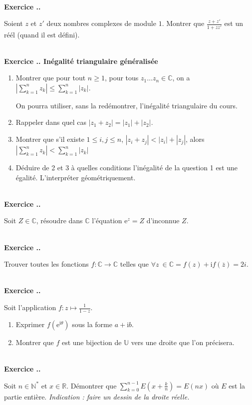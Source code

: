 \documentclass{article}
\newcommand{\mb}[1]{\mathbb{#1}}
\newcounter{exo}
\newcommand{\exercice}[1][\null]{\textbf{\\ \large Exercice \thesection.\theexo. \normalsize #1} \addtocounter{exo}{1}}
\begin{document}
\exercice

Soient $z$ et $z'$ deux nombres complexes de module $1$. Montrer que $\displaystyle \frac{z+z'}{1+zz'}$ est un réél (quand il est défini).

\exercice[Inégalité triangulaire généralisée]

\begin{enumerate}

\item Montrer que pour tout $n \ge 1$, pour tous $z_1 \dots z_n \in \mb{C}$, on a $\displaystyle \left|\sum_{k=1}^n z_k\right| \le \sum_{k=1}^n | z_k |$.

On pourra utiliser, sans la redémontrer, l'inégalité triangulaire du cours.

\item Rappeler dans quel cas $|z_1 + z_2| = |z_1| + |z_2|$.

\item Montrer que s'il existe $1 \le i,j \le n$, $|z_i + z_j| < |z_i| + |z_j|$, alors $ \left|\sum_{k=1}^n z_k\right| < \sum_{k=1}^n | z_k |$ 

\item Déduire de 2 et 3 à quelles conditions l'inégalité de la question 1 est une égalité. L'interpréter géométriquement.

\end{enumerate}

\exercice

Soit $Z \in \mb{C}$, résoudre dans $\mb{C}$ l'équation $\text{e}^z  = Z$ d'inconnue $Z$.


\exercice

Trouver toutes les fonctions $f : \mb{C} \rightarrow \mb{C}$ telles que $\forall z~\in \mb{C} = f(z) + \text{i} f(\overline{z}) = 2i$.

\exercice

Soit l'application $f : z \mapsto \frac{1}{1-z}$.

\begin{enumerate}

\item Exprimer $f(\text{e}^{\text{i}\theta})$ sous la forme $a + \text{i} b$.

\item Montrer que $f$ est une bijection de $\mb{U}$ vers une droite que l'on précisera.

\end{enumerate}

\exercice

Soit $n \in \mb{N^*}$ et $x \in \mb{R}$. Démontrer que $\displaystyle \sum_{k=0}^{n-1} E\left(x + \frac{k}{n}\right) = E(nx)$ où  $E$ est la partie entière. \emph{Indication : faire un dessin de la droite réelle.}
\end{document}
